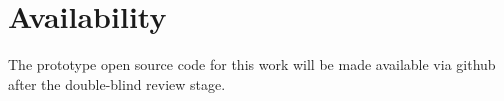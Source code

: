 \section*{Availability}
The prototype open source code for this work will be made available via github after the double-blind review stage.


